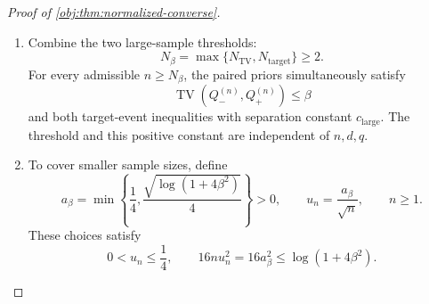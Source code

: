 \documentclass[11pt]{article}
\begin{document}
\begin{proof}[Proof of \cref{obj:thm:normalized-converse}]
\begin{enumerate}
Define the common good event, target threshold, and separation constant by
\[
\mathcal G
=\left\{|W-\mu_W|\le\frac{\mu_W}{2},
          \ |J-1|\le\frac12\right\},
\qquad
N_{\mathrm{target}}=\max\{N_W,N_J\},
\]
\[
c_{\mathrm{large}}
=\frac1{36\cdot1024\,C_{\mathrm{hyp}}\cdot48}>0.
\]
For admissible \(n\ge N_{\mathrm{target}}\), the union bound gives
\[
\Pr(\mathcal G)\ge1-\beta.
\]
On \(\mathcal G\),
\[
W\ge\frac{\mu_W}{2},
\qquad
0<J\le\frac32,
\qquad
\frac WJ\ge\frac{\mu_W}{3}.
\]
Since \(\delta\ge0\) and \(0<q\le1\), it follows that
\[
\frac{\delta}{16q}\frac WJ
\ge\frac{\delta\mu_W}{48}
\ge
\frac{\delta\zeta_{n,d}}
     {36\cdot1024\,C_{\mathrm{hyp}}\cdot48}
=c_{\mathrm{large}}g_{n,d,q}.
\]
Set
\[
m_0=\mu_0.
\]
The exact target identity therefore implies, on \(\mathcal G\),
\[
\tau(P_-)\le m_0-c_{\mathrm{large}}g_{n,d,q},
\qquad
m_0+c_{\mathrm{large}}g_{n,d,q}\le\tau(P_+).
\]
Because \(\Pi_\sigma=\operatorname{Law}(P_\sigma)\), the corresponding prior event masses equal the probabilities of their latent preimages. Hence
\[
\Pi_-\{\tau(P)\le m_0-c_{\mathrm{large}}g_{n,d,q}\}
\ge1-\beta,
\]
\[
\Pi_+\{m_0+c_{\mathrm{large}}g_{n,d,q}\le\tau(P)\}
\ge1-\beta.
\]

\item
Combine the two large-sample thresholds:
\[
N_\beta=\max\{N_{\mathrm{TV}},N_{\mathrm{target}}\}\ge2.
\]
For every admissible \(n\ge N_\beta\), the paired priors simultaneously satisfy
\[
\operatorname{TV}(Q_-^{(n)},Q_+^{(n)})\le\beta
\]
and both target-event inequalities with separation constant
\(c_{\mathrm{large}}\). The threshold and this positive constant are independent of \(n,d,q\).

\item
To cover smaller sample sizes, define
\[
a_\beta
=\min\left\{\frac14,
\frac{\sqrt{\log(1+4\beta^2)}}4\right\}>0,
\qquad
u_n=\frac{a_\beta}{\sqrt n},
\qquad n\ge1.
\]
These choices satisfy
\[
0<u_n\le\frac14,
\qquad
16nu_n^2=16a_\beta^2\le\log(1+4\beta^2).
\]


\end{enumerate}
\end{proof}
\end{document}
